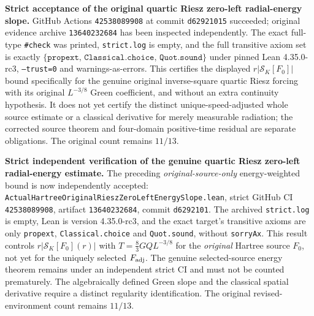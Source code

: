 \documentclass[11pt]{amsart}
\begin{document}
\medskip
\noindent\textbf{Strict acceptance of the original quartic Riesz
zero-left radial-energy slope.}
GitHub Actions \texttt{42538089908} at commit
\texttt{d62921015} succeeded; original evidence archive
\texttt{13640232684} has been inspected independently.
The exact full-type \texttt{\#check} was printed,
\texttt{strict.log} is empty, and the full transitive axiom
set is exactly
\(\{\texttt{propext},\,\texttt{Classical.choice},\,
\texttt{Quot.sound}\}\) under pinned Lean 4.35.0-rc3,
\texttt{--trust=0} and warnings-as-errors.
This certifies the displayed \(r|\mathcal S_K[F_0]|\) bound
specifically for the genuine original inverse-square
quartic Riesz forcing with its original \(L^{-3/8}\) Green
coefficient, and without an extra continuity hypothesis.
It does not yet certify the distinct unique-speed-adjusted
whole source estimate or a classical derivative for merely
measurable radiation; the corrected source theorem and
four-domain positive-time residual are separate obligations.
The original count remains \(11/13\).



\medskip
\noindent\textbf{Strict independent verification of the genuine
quartic Riesz zero-left radial-energy estimate.}
The preceding \emph{original-source-only} energy-weighted bound
is now independently accepted:
\texttt{ActualHartreeOriginalRieszZeroLeftEnergySlope.lean},
strict GitHub CI \texttt{42538089908}, artifact
\texttt{13640232684}, commit \texttt{d6292101}.
The archived \texttt{strict.log} is empty, Lean is
version 4.35.0-rc3, and the exact target's transitive
axioms are only \texttt{propext}, \texttt{Classical.choice}
and \texttt{Quot.sound}, without \texttt{sorryAx}.
This result controls
\(
r|\mathcal S_K[F_0](r)|
\)
with \(T=\frac83GQL^{-3/8}\) for the \emph{original}
Hartree source \(F_0\), not yet for the uniquely selected
\(F_{\rm adj}\).
The genuine selected-source energy theorem remains under
an independent strict CI and must not be counted prematurely.
The algebraically defined Green slope and the classical
spatial derivative require a distinct regularity identification.
The original revised-environment count remains \(11/13\).
\end{document}
